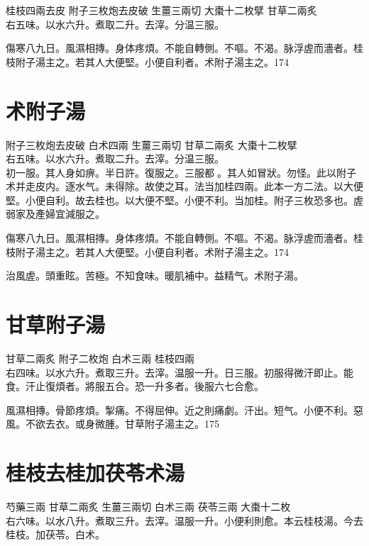 桂枝{\scriptsize 四兩去皮} 附子{\scriptsize 三枚炮去皮破} 生薑{\scriptsize 三兩切} 大棗{\scriptsize 十二枚擘} 甘草{\scriptsize 二兩炙}\\
右五味。以水六升。煮取二升。去滓。分温三服。

傷寒八九日。風濕相摶。身体疼煩。不能自轉側。不嘔。不渴。脉浮虗而濇者。桂枝附子湯主之。若其人大便堅。小便自利者。术附子湯主之。174

\section{术附子湯}

附子{\scriptsize 三枚炮去皮破} 白术{\scriptsize 四兩} 生薑{\scriptsize 三兩切} 甘草{\scriptsize 二兩炙} 大棗{\scriptsize 十二枚擘}\\
右五味。以水六升。煮取二升。去滓。分温三服。\\
初一服。其人身如痹。半日許。復服之。三服都{\sungii 𥁞}。其人如冒狀。勿怪。此以附子术并走皮内。逐水气。未得除。故使之耳。法当加桂四兩。此本一方二法。以大便堅。小便自利。故去桂也。以大便不堅。小便不利。当加桂。附子三枚恐多也。虗弱家及產婦宜減服之。

傷寒八九日。風濕相摶。身体疼煩。不能自轉側。不嘔。不渴。脉浮虗而濇者。桂枝附子湯主之。若其人大便堅。小便自利者。术附子湯主之。174

治風虗。頭重眩。苦極。不知食味。暖肌補中。益精气。术附子湯。

\section{甘草附子湯}

甘草{\scriptsize 二兩炙} 附子{\scriptsize 二枚炮} 白术{\scriptsize 三兩} 桂枝{\scriptsize 四兩}\\ 
右四味。以水六升。煮取三升。去滓。温服一升。日三服。初服得微汗即止。能食。汗止復煩者。將服五合。恐一升多者。後服六七合愈。

風濕相摶。骨節疼煩。掣痛。不得屈伸。近之則痛劇。汗出。短气。小便不利。惡風。不欲去衣。或身微腫。甘草附子湯主之。175

\section{桂枝去桂加茯苓术湯}

芍藥{\scriptsize 三兩} 甘草{\scriptsize 二兩炙} 生薑{\scriptsize 三兩切} 白术{\scriptsize 三兩} 茯苓{\scriptsize 三兩} 大棗{\scriptsize 十二枚}\\
右六味。以水八升。煮取三升。去滓。温服一升。小便利則愈。本云桂枝湯。今去桂枝。加茯苓。白术。

